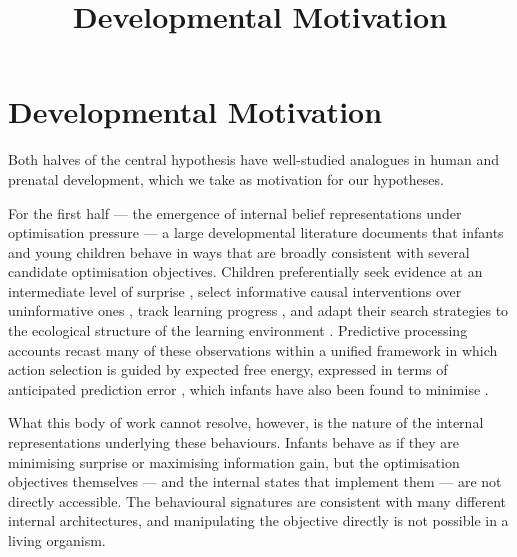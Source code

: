 \documentclass[12pt, a4paper]{article}
\title{Developmental Motivation}
\date{}
\begin{document}
\maketitle

\section*{Developmental Motivation}

Both halves of the central hypothesis have well-studied analogues in human and prenatal
development, which we take as motivation for our hypotheses.

For the first half --- the emergence of internal belief representations under optimisation
pressure --- a large developmental literature documents that infants and young children
behave in ways that are broadly consistent with several candidate optimisation objectives.
Children preferentially seek evidence at an intermediate level of surprise \citep[the
Goldilocks effect;][]{kidd2012goldilocks}, select informative causal interventions over
uninformative ones \citep{lapidow2020informative}, track learning progress
\citep{poli2020infants}, and adapt their search strategies to the ecological structure of
the learning environment \citep{ruggeri2022ecological}. Predictive processing accounts
recast many of these observations within a unified framework in which action selection is
guided by expected free energy, expressed in terms of anticipated prediction error
\citep{clark2013whatever, friston2016active}, which infants have also been found to
minimise \citep{zhang2019prediction}.

What this body of work cannot resolve, however, is the nature of the internal
representations underlying these behaviours. Infants behave as if they are minimising
surprise or maximising information gain, but the optimisation objectives themselves --- and
the internal states that implement them --- are not directly accessible. The behavioural
signatures are consistent with many different internal architectures, and manipulating the
objective directly is not possible in a living organism.
\end{document}
